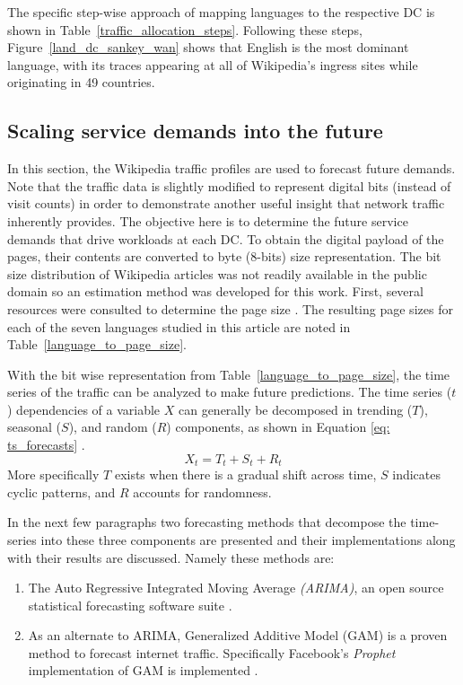     The specific step-wise approach of mapping languages to the respective DC is shown in Table~\ref{traffic_allocation_steps}. Following these steps, Figure~\ref{land_dc_sankey_wan} shows that English is the most dominant language, with its traces appearing at all of Wikipedia's ingress sites while originating in 49 countries.  
    
    
    
     
    
    \subsection{Scaling service demands into the future}
    
    In this section, the Wikipedia traffic profiles are used to forecast future demands. Note that the traffic data is slightly modified to represent digital bits (instead of visit counts) in order to demonstrate another useful insight that network traffic inherently provides. The objective here is to determine the future service demands that drive workloads at each DC. To obtain the digital payload of the pages, their contents are converted to byte (8-bits) size representation. The bit size distribution of Wikipedia articles was not readily available in the public domain so an estimation method was developed for this work. First, several resources were consulted to determine the page size \cite{wiki_stats, xtools}. The resulting page sizes for each of the seven languages studied in this article are noted in Table~\ref{language_to_page_size}. 
    
        
    
    With the bit wise representation from Table~\ref{language_to_page_size}, the time series of the traffic can be analyzed to make future predictions. The time series ($t$) dependencies of a variable $X$ can generally be decomposed in trending ($T$), seasonal ($S$), and random ($R$) components, as shown in Equation \ref{eq: ts_forecasts} \cite{zhuang15}. \begin{equation} X_t = T_t + S_t + R_t \label{eq: ts_forecasts} \end{equation} More specifically $T$ exists when there is a gradual shift across time, $S$ indicates cyclic patterns, and $R$ accounts for randomness.   
    
    In the next few paragraphs two forecasting methods that decompose the time-series into these three components are presented and their implementations along with their results are discussed. Namely these methods are:
    \begin{enumerate}
        \item The Auto Regressive Integrated Moving Average \textit{(ARIMA)}, an open source statistical forecasting software suite \cite{arima_py}.
        \item As an alternate to ARIMA, Generalized Additive Model (GAM) is a proven method to forecast internet traffic. Specifically Facebook's \textit{Prophet} implementation of GAM is implemented \cite{fbprophet}.
    \end{enumerate}
    
